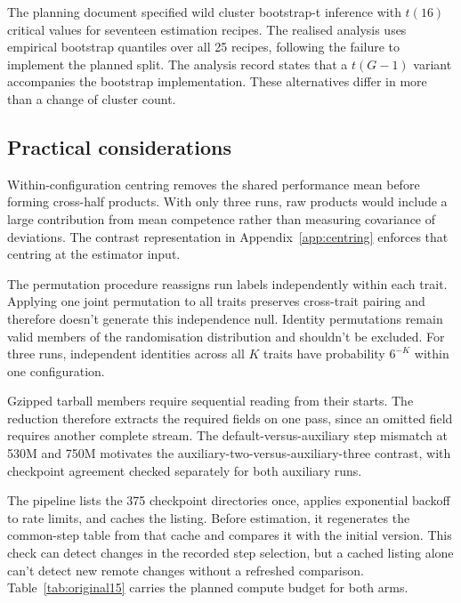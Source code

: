 The planning document specified wild cluster bootstrap-t inference with $t(16)$ critical values for seventeen estimation recipes. The realised analysis uses empirical bootstrap quantiles over all 25 recipes, following the failure to implement the planned split. The analysis record states that a $t(G-1)$ variant accompanies the bootstrap implementation. These alternatives differ in more than a change of cluster count.

\subsection{Practical considerations}
Within-configuration centring removes the shared performance mean before forming cross-half products. With only three runs, raw products would include a large contribution from mean competence rather than measuring covariance of deviations. The contrast representation in Appendix~\ref{app:centring} enforces that centring at the estimator input.

The permutation procedure reassigns run labels independently within each trait. Applying one joint permutation to all traits preserves cross-trait pairing and therefore doesn't generate this independence null. Identity permutations remain valid members of the randomisation distribution and shouldn't be excluded. For three runs, independent identities across all $K$ traits have probability $6^{-K}$ within one configuration.

Gzipped tarball members require sequential reading from their starts. The reduction therefore extracts the required fields on one pass, since an omitted field requires another complete stream. The default-versus-auxiliary step mismatch at 530M and 750M motivates the auxiliary-two-versus-auxiliary-three contrast, with checkpoint agreement checked separately for both auxiliary runs.

The pipeline lists the 375 checkpoint directories once, applies exponential backoff to rate limits, and caches the listing. Before estimation, it regenerates the common-step table from that cache and compares it with the initial version. This check can detect changes in the recorded step selection, but a cached listing alone can't detect new remote changes without a refreshed comparison. Table~\ref{tab:original15} carries the planned compute budget for both arms.

